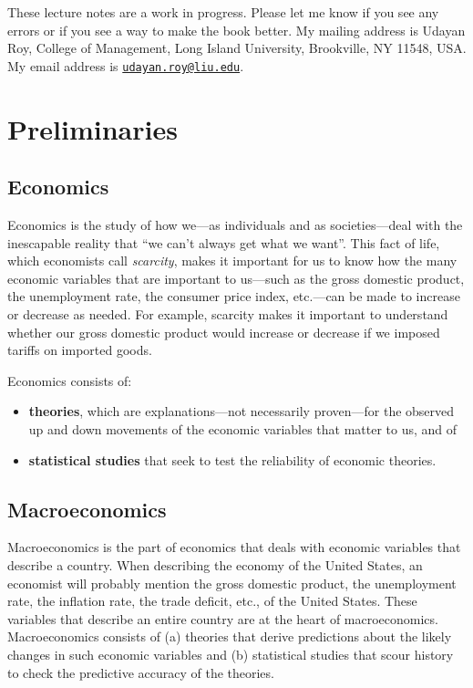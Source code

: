 \documentclass[
  letterpaper,
]{book}
\providecommand{\tightlist}{%
  \setlength{\itemsep}{0pt}\setlength{\parskip}{0pt}}\usepackage{longtable,booktabs,array}
\theoremstyle{plain}
\theoremstyle{remark}
\begin{document}
These lecture notes are a work in progress. Please let me know if you
see any errors or if you see a way to make the book better. My mailing
address is Udayan Roy, College of Management, Long Island University,
Brookville, NY 11548, USA. My email address is
\href{mailto:udayan.roy@liu.edu}{\nolinkurl{udayan.roy@liu.edu}}.


\chapter{Preliminaries}\label{sec-preliminaries}

\section{Economics}\label{sec-economics}

Economics is the study of how we---as individuals and
as societies---deal with the inescapable reality that ``we can't always
get what we want''. This fact of life, which economists call
\emph{scarcity}, makes it important for us to know how the many economic
variables that are important to us---such as the gross domestic product,
the unemployment rate, the consumer price index, etc.---can be made to
increase or decrease as needed. For example, scarcity makes it important
to understand whether our gross domestic product would increase or
decrease if we imposed tariffs on imported goods.

Economics consists of:

\begin{itemize}
\tightlist
\item
  \textbf{theories}, which are explanations---not necessarily
  proven---for the observed up and down movements of the economic
  variables that matter to us, and of
\item
  \textbf{statistical studies} that seek to test the reliability of
  economic theories.
\end{itemize}

\section{Macroeconomics}\label{sec-macro}

Macroeconomics is the part of economics
that deals with economic variables that describe a country. When
describing the economy of the United States, an economist will probably
mention the gross domestic product, the unemployment rate, the inflation
rate, the trade deficit, etc., of the United States. These variables
that describe an entire country are at the heart of macroeconomics.
Macroeconomics consists of (a) theories that derive predictions about
the likely changes in such economic variables and (b) statistical
studies that scour history to check the predictive accuracy of the
theories.
\end{document}
